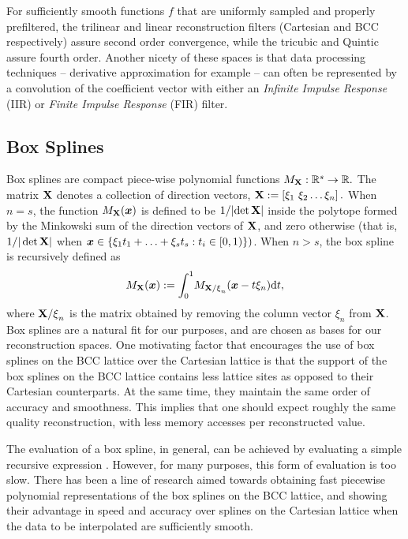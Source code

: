 For sufficiently smooth functions $f$ that are uniformly sampled and properly prefiltered, the trilinear and linear reconstruction filters (Cartesian and BCC respectively) assure second order convergence, while the tricubic and Quintic assure fourth order. 
Another nicety of these spaces is that data processing techniques -- derivative approximation for example -- can often be represented by a convolution of the coefficient vector with either an \emph{Infinite Impulse Response} (IIR) or \emph{Finite Impulse Response} (FIR) filter. 

\subsection{Box Splines} \label{sec:box_review}
Box splines are compact piece-wise polynomial functions $ M_\mathbf{\mathbf{X}} : \mathbb{R}^s \to \mathbb{R}.$ 
The matrix $\mathbf{\mathbf{X}}$ denotes a collection of direction vectors, $\mathbf{\mathbf{X}} := \left[ \xi_1 \ \xi_2 \hdots \xi_n\right].$ 
When $n=s$, the function $M_\mathbf{\mathbf{X}}(\boldsymbol{x})$ is defined to be ${1}/|{\det\mathbf{\mathbf{X}}}|$ inside the polytope formed by the Minkowski sum of the direction vectors of $\mathbf{\mathbf{X}}$, and zero otherwise (that is, ${1}/{|\det\mathbf{\mathbf{X}}|}$ when $\boldsymbol{x} \in \{ \mathbf{\xi}_1 t_1 + \hdots + \mathbf{\xi}_s t_s  : t_i\in [0,1) \})$. 
When $n > s$, the box spline is recursively defined as {\small 
\begin{equation} \label{eq:box_def}
	M_{\mathbf{\Xii}}(\vx) := \int_0^1{\!M_{\mathbf{\Xii/\xi}_n}(\vx - t\mathbf{\xi}_n)} \mathrm{d}t,
\end{equation}}
where ${\mathbf{\mathbf{X}/\xi}_n}$ is the matrix obtained by removing the column vector $\xi_n$ from $\mathbf{\mathbf{X}}$. 
Box splines are a natural fit for our purposes, and are chosen as bases for our reconstruction spaces.
One motivating factor that encourages the use of box splines on the BCC lattice over the Cartesian lattice is that the support of the box splines on the BCC lattice contains less lattice sites as opposed to their Cartesian counterparts. 
At the same time, they maintain the same order of accuracy and smoothness. 
This implies that one should expect roughly the same quality reconstruction, with less memory accesses per reconstructed value.

The evaluation of a box spline, in general, can be achieved by evaluating a simple recursive expression \cite{boorboxsplines}. 
However, for many purposes, this form of evaluation is too slow. 
There has been a line of research \cite{firstbox} aimed towards obtaining fast piecewise polynomial representations of the box splines on the BCC lattice, and showing their advantage in speed and accuracy over splines on the Cartesian lattice when the data to be interpolated are sufficiently smooth.

